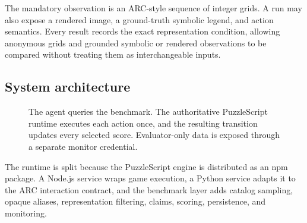 \documentclass[a4paper,11pt]{article}
\begin{document}
The mandatory observation is an ARC-style sequence of integer grids. A run may
also expose a rendered image, a ground-truth symbolic legend, and action
semantics. Every result records the exact representation condition, allowing
anonymous grids and grounded symbolic or rendered observations to be compared
without treating them as interchangeable inputs.

\subsection{System architecture}

\begin{figure}[H]
  \centering
  \caption{The agent queries the benchmark. The authoritative PuzzleScript
  runtime executes each action once, and the resulting transition updates every
  selected score. Evaluator-only data is exposed through a separate monitor
  credential.}
  \label{fig:architecture}
\end{figure}

The runtime is split because the PuzzleScript engine is distributed as an npm
package. A Node.js service wraps game execution, a Python service adapts it to
the ARC interaction contract, and the benchmark layer adds catalog sampling,
opaque aliases, representation filtering, claims, scoring, persistence, and
monitoring.
\end{document}
